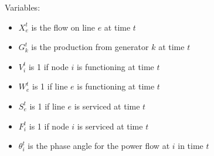 \documentclass{article}
\begin{document}
Variables:
	\begin{itemize}
		\item $X_{e}^{t}$ is the flow on line $e$ at time $t$
		\item $G_{k}^t$ is the production from generator $k$ at time $t$
		\item $V_i^t$ is 1 if node $i$ is functioning at time $t$
		\item $W_{e}^t$ is 1 if line $e$ is functioning at time $t$
		\item $S_{e}^t$ is 1 if line $e$ is serviced at time $t$
		\item $F_i^t$ is 1 if node $i$ is serviced at time $t$ 
		\item $\theta_i^t$ is the phase angle for the power flow at $i$ in time $t$	
	\end{itemize}
	
\end{document}
